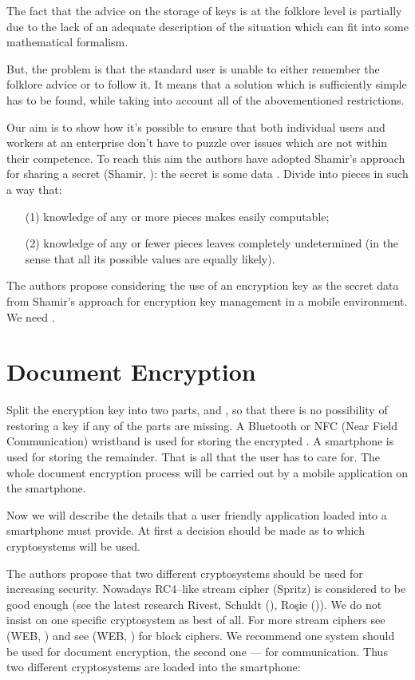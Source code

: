 \documentclass{bjmc}
\begin{document}
The fact that the advice on the storage of keys is at the folklore level is partially due to the lack of an adequate description of the situation which can fit into some mathematical formalism.

But, the problem is that the standard user is unable to either remember the folklore advice or to follow it. It means that a solution which is sufficiently simple has to be found, while taking into
 account all of the abovementioned restrictions. 

Our aim is to show how it's possible to ensure that both individual users and workers at an enterprise don't have to puzzle over issues which are not within their competence.
To reach this aim the authors have adopted Shamir's approach for sharing a secret (Shamir, \cite{Sha}): the secret is some data . 
Divide  into  pieces 
in such a way that:
\begin{itemize}
\item[(1)] knowledge of any  or more  pieces makes  easily computable;
\item[(2)] knowledge of any  or fewer  pieces leaves  completely undetermined (in the sense that all its possible values
are equally likely).
\end{itemize}
The authors propose considering the use of an encryption key as the secret data  from Shamir's approach for encryption key management in a mobile environment.
We need .

\section{Document Encryption} 

Split the encryption key  into two parts,  and , so that there is no possibility of restoring a key if any of the parts are missing. 
A Bluetooth or NFC (Near Field Communication) wristband is used for storing the encrypted . A smartphone is used for storing the remainder. That is all that the user has to care for. 
The whole document encryption process will be carried out by a mobile application on the smartphone.

Now we will describe the details that a user friendly application loaded into a smartphone must provide. 
At first a decision should be made as to which cryptosystems will be used. 

The authors propose that two different cryptosystems should be used for increasing security. 
Nowadays RC4--like stream cipher (Spritz) is considered to be good enough (see the latest research  Rivest,  Schuldt (\cite{Sp}), Ro\c sie (\cite{Ro})).   
 We do not insist on one specific cryptosystem as best of all.
For more stream ciphers see (WEB, \cite{eS}) and see (WEB, \cite{Bl}) for block ciphers. We recommend one system should be used for document encryption, the second one --- 
for communication.
Thus two different cryptosystems are loaded into the smartphone:
\end{document}
